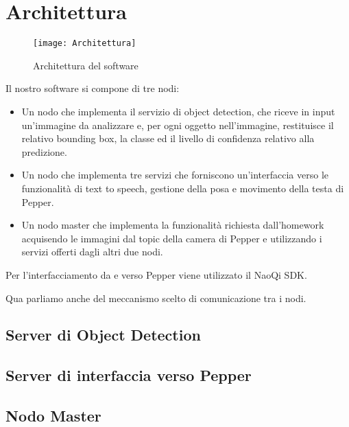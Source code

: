 \section{Architettura}

\begin{figure}[ht]
	\centering
	\texttt{[image: Architettura]}
	\caption{Architettura del software}
	\label{fig:architecture}
\end{figure}

Il nostro software si compone di tre nodi:
\begin{itemize}
    \item Un nodo che implementa il servizio di object detection, che riceve in input un’immagine da analizzare e, per ogni oggetto nell’immagine, restituisce il relativo bounding box, la classe ed il livello di confidenza relativo alla predizione.
    \item Un nodo che implementa tre servizi che forniscono un’interfaccia verso le funzionalità di text to speech, gestione della posa e movimento della testa di Pepper.
    \item Un nodo master che implementa la funzionalità richiesta dall’homework acquisendo le immagini dal topic della camera di Pepper e utilizzando i servizi offerti dagli altri due nodi.
\end{itemize}
Per l’interfacciamento da e verso Pepper viene utilizzato il NaoQi SDK.

Qua parliamo anche del meccanismo scelto di comunicazione tra i nodi.


\subsection{Server di Object Detection}

\subsection{Server di interfaccia verso Pepper}

\subsection{Nodo Master}